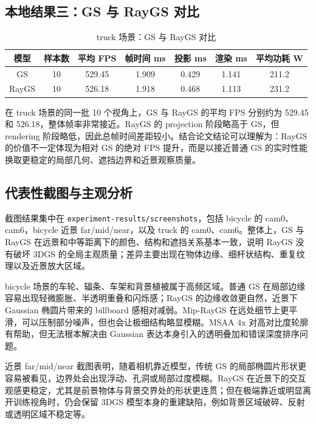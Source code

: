 \documentclass[12pt,hyperref,a4paper,UTF8]{ctexart}
\begin{document}
\subsection{本地结果三：GS 与 RayGS 对比}

\begin{table}[H]
    \centering
    \caption{truck 场景：GS 与 RayGS 对比}
    \label{tab:local_gs_raygs_truck}
    \setlength{\tabcolsep}{6pt}
    \renewcommand{\arraystretch}{1.2}
    \begin{tabular}{ccccccc}
        \bottomrule[1.5pt]
        \textbf{模型} & \textbf{样本数} & \textbf{平均 FPS} & \textbf{帧时间 ms} & \textbf{投影 ms} & \textbf{渲染 ms} & \textbf{平均功耗 W} \\
        \midrule[0.5pt]
        GS & 10 & 529.45 & 1.909 & 0.429 & 1.141 & 211.2 \\
        RayGS & 10 & 526.18 & 1.918 & 0.468 & 1.113 & 231.2 \\
        \toprule[1.5pt]
    \end{tabular}
\end{table}

在 truck 场景的同一批 10 个视角上，GS 与 RayGS 的平均 FPS 分别约为 529.45 和 526.18，整体帧率非常接近。RayGS 的 projection 阶段略高于 GS，但 rendering 阶段略低，因此总帧时间差距较小。结合论文结论可以理解为：RayGS 的价值不一定体现为相对 GS 的绝对 FPS 提升，而是以接近普通 GS 的实时性能换取更稳定的局部几何、遮挡边界和近景观察质量。



\subsection{代表性截图与主观分析}
截图结果集中在 \texttt{experiment-results/screenshots}，包括 bicycle 的 cam0、cam6，bicycle 近景 far/mid/near，以及 truck 的 cam0、cam6。整体上，GS 与 RayGS 在远景和中等距离下的颜色、结构和遮挡关系基本一致，说明 RayGS 没有破坏 3DGS 的全局主观质量；差异主要出现在物体边缘、细杆状结构、重复纹理以及近景放大区域。

bicycle 场景的车轮、辐条、车架和背景植被属于高频区域。普通 GS 在局部边缘容易出现轻微膨胀、半透明重叠和闪烁感；RayGS 的边缘收敛更自然，近景下 Gaussian 椭圆片带来的 billboard 感相对减弱。Mip-RayGS 在远处细节上更平滑，可以压制部分噪声，但也会让极细结构略显模糊。MSAA 4x 对高对比度轮廓有帮助，但无法根本解决由 Gaussian 表达本身引入的透明叠加和错误深度排序问题。

近景 far/mid/near 截图表明，随着相机靠近模型，传统 GS 的局部椭圆片形状更容易被看见，边界处会出现浮动、孔洞或局部过度模糊。RayGS 在近景下的交互观感更稳定，尤其是前景物体与背景交界处的形状更连贯；但在极端靠近或明显离开训练视角时，仍会保留 3DGS 模型本身的重建缺陷，例如背景区域破碎、反射或透明区域不稳定等。
\end{document}
